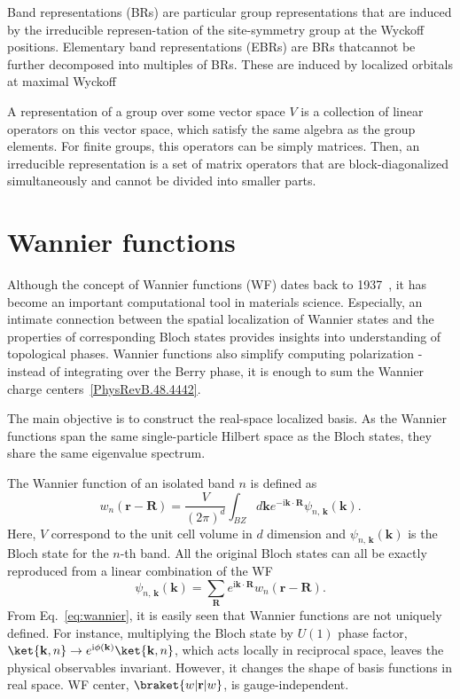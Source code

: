 Band representations (BRs) are particular group representations that are induced by the irreducible represen-tation of the site-symmetry group at the Wyckoff positions.  Elementary band representations (EBRs) are BRs thatcannot be further decomposed into multiples of BRs.  These are induced by localized orbitals at maximal Wyckoff


A representation of a group over some vector space $V$ is a collection of linear operators on  this  vector  space,  which  satisfy  the  same  algebra  as  the  group  elements. For finite groups, this operators can be simply matrices. Then, an irreducible representation is a set of matrix operators that are block-diagonalized simultaneously and cannot be divided into smaller parts.


\chapter{Wannier functions}
\label{ch:app_wannier}
Although the concept of Wannier functions (WF) dates back to 1937~\cite{PhysRev.52.191}, it has become an important computational tool in materials science. Especially, an intimate connection between the spatial localization of Wannier states and the properties of corresponding Bloch states provides insights into understanding of topological phases. Wannier functions also simplify computing polarization - instead of integrating over the Berry phase, it is enough to sum the Wannier charge centers~\ref{PhysRevB.48.4442}.

The main objective is to construct the real-space localized basis. As the Wannier functions span the same single-particle Hilbert space as the Bloch states, they share the same eigenvalue spectrum.

The Wannier function of an isolated band $n$ is defined as
\begin{equation}
w_n (\mathbf{r} - \mathbf{R})= \frac{V}{(2 \pi)^d} \int_{BZ} d \mathbf{k} e^{-\mathrm{i} \mathbf{k} \cdot \mathbf{R}}  \psi_{n, \, \mathbf{k}} (\mathbf{k}).
\label{eq:wannier}
\end{equation}
Here, $V$ correspond to the unit cell volume in $d$ dimension and $  \psi_{n, \, \mathbf{k}} (\mathbf{k})$ is the Bloch state for the $n$-th band. All the original Bloch states can all be exactly reproduced from a linear combination of the WF
\begin{equation}
\psi_{n, \, \mathbf{k}} (\mathbf{k}) = \sum_{\mathbf{R}} e^{\mathrm{i} \mathbf{k} \cdot \mathbf{R}} w_n (\mathbf{r} - \mathbf{R}).
\label{eq:wannier_inverse}
\end{equation}
From Eq.~\eqref{eq:wannier}, it is easily seen that Wannier functions are not uniquely defined. For instance, multiplying the Bloch state by $U(1)$ phase factor, $\ket{\mathbf{k}, n} \rightarrow e^{\textnormal{i} \phi( \mathbf{k} )} \ket{\mathbf{k}, n}$, which acts locally in reciprocal space, leaves the physical observables invariant. However, it changes the shape of basis functions in real space. WF center, $\braket{w | \mathbf{r} | w}$, is gauge-independent.




